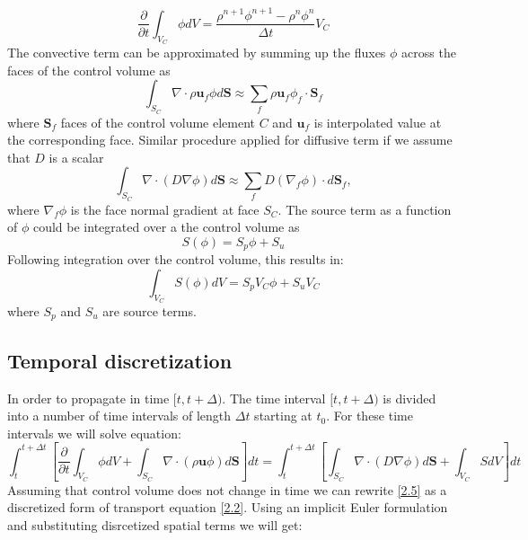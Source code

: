\begin{equation}
    \frac{\partial}{\partial t}\int_{V_C} \phi d V = \frac{ \rho^{n+1} \phi^{n+1} -  \rho^{n}\phi^{n} }{\Delta t} V_C
\end{equation}
The convective term can be approximated by summing up the fluxes $\phi$ across the faces of the control volume as
\begin{equation}
    \int_{S_C}\nabla \cdot \rho\mathbf{u}_f \phi d \mathbf{S} \approx \sum_f  \rho\mathbf{u}_f \phi_f\cdot \mathbf{S}_f
\end{equation}
where $\mathbf{S}_f$ faces of the control volume element $C$ and $\mathbf{u}_{f}$ is interpolated value at the corresponding face.
Similar procedure applied for diffusive term if we assume that $D$ is a scalar
\begin{equation}
    \int_{S_C}\nabla\cdot(D \nabla \phi) d \mathbf{S} \approx \sum_f D (\nabla_f \phi)\cdot{d\mathbf{S}_f},
\end{equation}
where $ \nabla_f \phi$ is the face normal gradient at face $S_C$. The source term as a function of $\phi$ could be integrated over a the control volume as
\begin{equation}
  S(\phi) = S_p\phi +S_u
  \end{equation}
Following integration over the control volume, this results in:
  \begin{equation}
\int_{V_C} S(\phi) d V  = S_p V_C\phi +S_u V_C
\end{equation}
where $S_p$ and $S_u$ are source terms.

\subsection{Temporal discretization}
In order to propagate in time $[t, t+\Delta)$. The time interval $[t, t+\Delta)$ is divided into a number of time intervals of length $\Delta t$ starting at $t_0$. For these time intervals we will solve equation:
\begin{equation}\label{2.5}
\int^{t+\Delta t}_t \left[\frac{\partial}{\partial t}\int_{V_C} \phi d V+\int_{S_C} \nabla \cdot(\rho \mathbf{u}\phi) d \mathbf{S}\right] d t=\int^{t+\Delta t}_t\left[\int_{S_C} \nabla \cdot(D \nabla \phi) d \mathbf{S} + \int_{V_C} S d V\right] d t
\end{equation}
Assuming that control volume does not change in time we can rewrite \ref{2.5} as a discretized form of transport equation \ref{2.2}. Using an implicit Euler formulation and substituting disrcetized spatial terms we will get:

